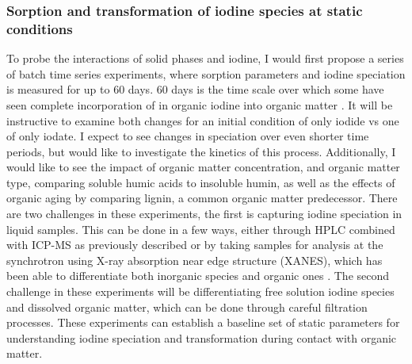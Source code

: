 \documentclass[twoside,12pt,titlepage]{article}
\begin{document}
\subsubsection{Sorption and transformation of iodine species at static conditions}
To probe the interactions of solid phases and iodine, I would first propose a series of batch time series experiments, where sorption parameters and iodine speciation is measured for up to 60 days. 60 days is the time scale over which some have seen complete incorporation of in organic iodine into organic matter \cite{Yamaguchi2008}. It will be instructive to examine both changes for an initial condition of only iodide vs one of only iodate. I expect to see changes in speciation over even shorter time periods, but would like to investigate the kinetics of this process. Additionally, I would like to see the impact of organic matter concentration, and organic matter type, comparing soluble humic acids to insoluble humin, as well as the effects of organic aging by comparing lignin, a common organic matter predecessor. There are two challenges in these experiments, the first is capturing iodine speciation in liquid samples. This can be done in a few ways, either through HPLC combined with ICP-MS as previously described \cite{Wuilloud2005} or by taking samples for analysis at the synchrotron using X-ray absorption near edge structure (XANES), which has been able to differentiate both inorganic species and organic ones \cite{Yamaguchi2008}. The second challenge in these experiments will be differentiating free solution iodine species and dissolved organic matter, which can be done through careful filtration processes. These experiments can establish a baseline set of static parameters for understanding iodine speciation and transformation during contact with organic matter.
\end{document}
